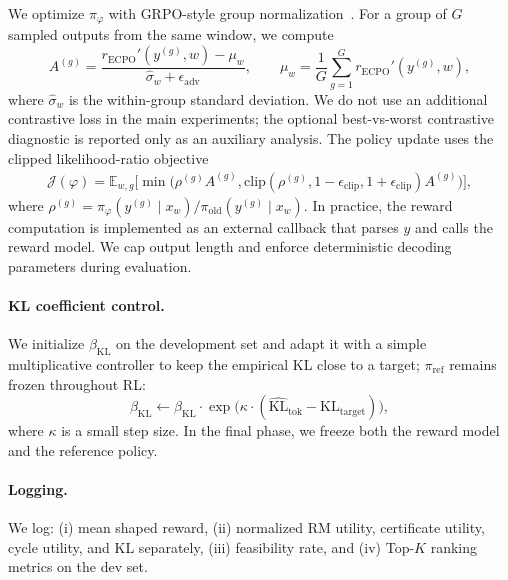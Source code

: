 \documentclass{article}
\begin{document}
We optimize $\pi_\varphi$ with GRPO-style group normalization~\citep{shao_deepseekmath_2024}.
For a group of $G$ sampled outputs from the same window, we compute
\begin{equation}
A^{(g)}=
\frac{r_{\mathrm{ECPO}}'(y^{(g)},w)-\mu_w}{\hat{\sigma}_w+\epsilon_{\mathrm{adv}}},
\qquad
\mu_w=\frac{1}{G}\sum_{g=1}^{G}r_{\mathrm{ECPO}}'(y^{(g)},w),
\end{equation}
where $\hat{\sigma}_w$ is the within-group standard deviation.
We do not use an additional contrastive loss in the main experiments; the optional best-vs-worst contrastive diagnostic is reported only as an auxiliary analysis.
The policy update uses the clipped likelihood-ratio objective
\begin{equation}
\begin{aligned}
\mathcal{J}(\varphi)=
\mathbb{E}_{w,g}\!\Big[
\min\!\Big(
\rho^{(g)}A^{(g)},
\mathrm{clip}(\rho^{(g)},1-\epsilon_{\mathrm{clip}},1+\epsilon_{\mathrm{clip}})A^{(g)}
\Big)
\Big],
\end{aligned}
\end{equation}
where $\rho^{(g)}=\pi_\varphi(y^{(g)}\mid x_w)/\pi_{\mathrm{old}}(y^{(g)}\mid x_w)$.
In practice, the reward computation is implemented as an external callback that parses $y$ and calls the reward model.
We cap output length and enforce deterministic decoding parameters during evaluation.

\paragraph{KL coefficient control.}
We initialize $\beta_{\mathrm{KL}}$ on the development set and adapt it with a simple multiplicative controller to keep the empirical KL close to a target; $\pi_{\mathrm{ref}}$ remains frozen throughout RL:
\begin{equation}
\beta_{\mathrm{KL}} \leftarrow \beta_{\mathrm{KL}} \cdot \exp\Big(\kappa\cdot (\widehat{\mathrm{KL}}_{\mathrm{tok}}-\mathrm{KL}_{\mathrm{target}})\Big),
\end{equation}
where $\kappa$ is a small step size.
In the final phase, we freeze both the reward model and the reference policy.

\paragraph{Logging.}
We log: (i) mean shaped reward, (ii) normalized RM utility, certificate utility, cycle utility, and KL separately, (iii) feasibility rate, and (iv) Top-$K$ ranking metrics on the dev set.
\end{document}
